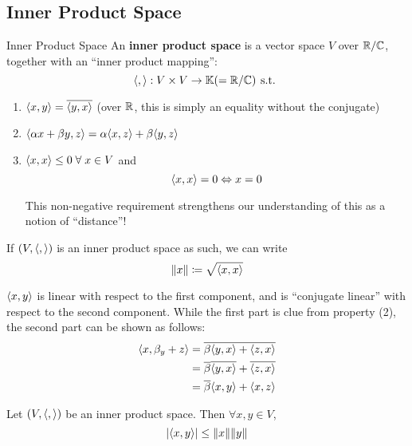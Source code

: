 \subsection{Inner Product Space}
\begin{definition} {Inner Product Space}
    An \textbf{inner product space} is a vector space \(V\) over \(\mathbb{R} / \mathbb{C}\), together with an ``inner product mapping'': \[
        \langle ,  \rangle: V \times V \to \mathbb{K} (= \mathbb{R} / \mathbb{C}) \hspace*{4pt}\text{s.t.}\hspace*{4pt}
    \]
    \begin{enumerate}
        \item \(\langle x, y \rangle = \overline{\langle y, x \rangle}\) (over \(\mathbb{R}\), this is simply an equality without the conjugate)
        \item \(\langle \alpha x + \beta y, z \rangle = \alpha \langle x, z \rangle + \beta \langle y, z \rangle\)
        \item \(\innerproduct{x}{x} \leq 0 \forall x \in V\) and \[
                  \langle x, x \rangle = 0 \Leftrightarrow x = 0
              \]

              This non-negative requirement strengthens our understanding of this as a notion of ``distance''!
    \end{enumerate}
\end{definition}

If \((V, \langle ,  \rangle)\) is an inner product space as such, we can write \[
    \lVert x\rVert \coloneqq \sqrt{\langle x, x \rangle}
\]
\begin{observe}
    \(\langle x, y \rangle\) is linear with respect to the first component, and is ``conjugate linear'' with respect to the second component. While the first part is clue from property (2), the second part can be shown as follows:
    \begin{align*}
        \langle x, \beta_y + z \rangle & = \overline{\beta\langle y, x \rangle + \langle z, x \rangle}                \\
                                      & = \overline{\beta} \overline{\langle y, x \rangle} + \overline{\langle z, x \rangle} \\
                                      & = \overline{\beta} \langle x, y \rangle + \langle x, z \rangle
    \end{align*}
\end{observe}
\begin{lemma} 
    Let \((V, \langle ,  \rangle)\) be an inner product space. Then \(\forall x, y \in V  \), \[
        \lvert\langle x, y \rangle\rvert \leq \lVert x\rVert \lVert y\rVert
    \]
\end{lemma}

